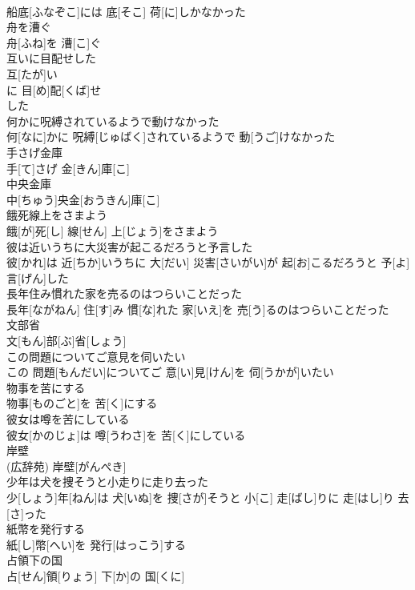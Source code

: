 \documentclass[8pt]{extreport}
\begin{document}
\begin{CJK}{UTF8}{min}
\\	船底[ふなぞこ]には 底[そこ] 荷[に]しかなかった
\\	舟を漕ぐ	
\\	舟[ふね]を 漕[こ]ぐ
\\	互いに目配せした	
\\	互[たが]い 
\\	に 目[め]配[くば]せ 
\\	した
\\	何かに呪縛されているようで動けなかった	
\\	何[なに]かに 呪縛[じゅばく]されているようで 動[うご]けなかった
\\	手さげ金庫	
\\	手[て]さげ 金[きん]庫[こ]
\\	中央金庫	
\\	中[ちゅう]央金[おうきん]庫[こ]
\\	餓死線上をさまよう	
\\	餓[が]死[し] 線[せん] 上[じょう]をさまよう
\\	彼は近いうちに大災害が起こるだろうと予言した	
\\	彼[かれ]は 近[ちか]いうちに 大[だい] 災害[さいがい]が 起[お]こるだろうと 予[よ]言[げん]した
\\	長年住み慣れた家を売るのはつらいことだった	
\\	長年[ながねん] 住[す]み 慣[な]れた 家[いえ]を 売[う]るのはつらいことだった
\\	文部省	
\\	文[もん]部[ぶ]省[しょう]
\\	この問題についてご意見を伺いたい	
\\	この 問題[もんだい]についてご 意[い]見[けん]を 伺[うかが]いたい
\\	物事を苦にする	
\\	物事[ものごと]を 苦[く]にする
\\	彼女は噂を苦にしている	
\\	彼女[かのじょ]は 噂[うわさ]を 苦[く]にしている
\\	岸壁	
\\	(広辞苑)	岸壁[がんぺき]
\\	少年は犬を捜そうと小走りに走り去った	
\\	少[しょう]年[ねん]は 犬[いぬ]を 捜[さが]そうと 小[こ] 走[ばし]りに 走[はし]り 去[さ]った
\\	紙幣を発行する	
\\	紙[し]幣[へい]を 発行[はっこう]する
\\	占領下の国	
\\	占[せん]領[りょう] 下[か]の 国[くに]

\end{CJK}
\end{document}
